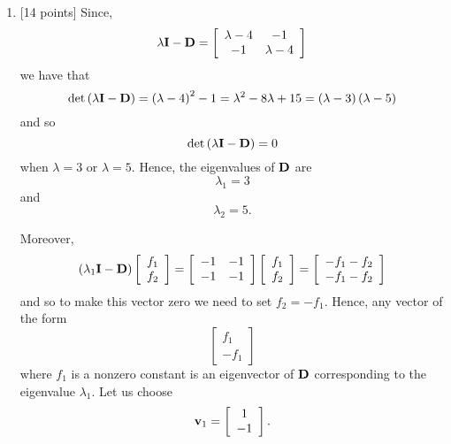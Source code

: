 \begin{solution}
\begin{enumerate}
\item {[14 points]} Since,
\[
\lambda{\bf I}-{\bf D}=\left[\begin{array}{cc}\lambda-4 & -1\\-1 & \lambda-4\end{array}\right]
\]
we have that
\[
\det\left(\lambda{\bf I}-{\bf D}\right)=\left(\lambda-4\right)^2-1=\lambda^2-8\lambda+15=\left(\lambda-3\right)\left(\lambda-5\right)
\]
and so
\[
\det\left(\lambda{\bf I}-{\bf D}\right)=0
\]
when $\lambda=3$ or $\lambda=5$. Hence, the eigenvalues of ${\bf D}$ are
\[
\lambda_1=3
\]
and
\[
\lambda_2=5.
\]

Moreover,
\[
\left(\lambda_1{\bf I}-{\bf D}\right)\left[\begin{array}{c}f_1 \\ f_2\end{array}\right]=\left[\begin{array}{cc}-1 & -1\\-1 & -1\end{array}\right]\left[\begin{array}{c}f_1 \\ f_2\end{array}\right]=\left[\begin{array}{c}-f_1-f_2 \\ -f_1-f_2\end{array}\right]
\]
and so to make this vector zero we need to set $f_2=-f_1$. Hence, any vector of the form
\[
\left[\begin{array}{c}f_1 \\ -f_1\end{array}\right]
\]
where $f_1$ is a nonzero constant is an eigenvector of ${\bf D}$ corresponding to the eigenvalue $\lambda_1$. Let us choose
\[
{\bf v}_1=\left[\begin{array}{c}1 \\ -1\end{array}\right].
\]


\end{enumerate}
\end{solution}
